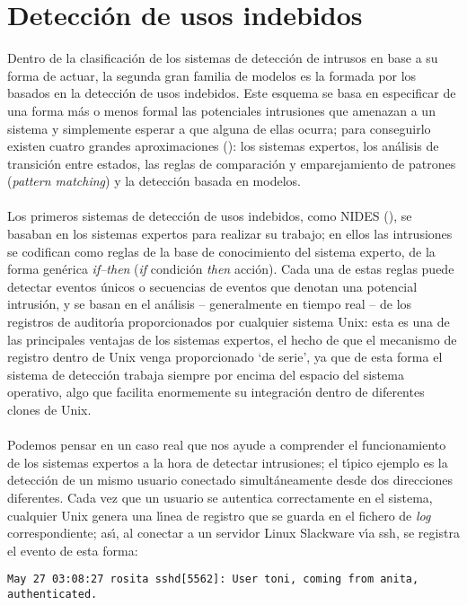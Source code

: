 \section{Detecci\'on de usos indebidos}
Dentro de la clasificaci\'on de los sistemas de detecci\'on de intrusos en
base a su forma de actuar, la segunda gran familia de modelos es la formada por
los basados en la detecci\'on de usos indebidos. Este esquema se basa en 
especificar de una forma m\'as o menos formal las potenciales intrusiones que 
amenazan a un sistema y simplemente esperar a que alguna de ellas ocurra; para
conseguirlo existen cuatro grandes aproximaciones (\cite{kn:ko96}): los 
sistemas expertos, los an\'alisis de transici\'on entre estados, las reglas de
comparaci\'on y emparejamiento de patrones ({\it pattern matching}) y la 
detecci\'on basada en modelos.\\
\\Los primeros sistemas de detecci\'on de usos indebidos, como NIDES 
(\cite{kn:lu92}), se basaban en los sistemas expertos para realizar su trabajo; 
en ellos las intrusiones se codifican como reglas de la base de conocimiento 
del sistema experto, de la forma gen\'erica {\it if--then} ({\it if} {\sc 
condici\'on} {\it then} {\sc acci\'on}). Cada una de estas reglas
puede detectar eventos \'unicos o secuencias de eventos que denotan una 
potencial intrusi\'on, y se basan en el an\'alisis -- generalmente en tiempo 
real -- de los registros de auditor\'{\i}a proporcionados por cualquier sistema
Unix: esta es una de las principales ventajas de los sistemas expertos, el hecho
de que el mecanismo de registro dentro de Unix venga proporcionado `de serie',
ya que de esta forma el sistema de detecci\'on trabaja siempre por encima del
espacio del sistema operativo, algo que facilita enormemente su integraci\'on 
dentro de diferentes clones de Unix.\\
\\Podemos pensar en un caso real que nos ayude a comprender el funcionamiento de
los sistemas expertos a la hora de detectar intrusiones; el t\'{\i}pico 
ejemplo es la detecci\'on de un mismo usuario conectado simult\'aneamente desde
dos direcciones diferentes. Cada vez que un usuario se autentica correctamente
en el sistema, cualquier Unix genera una l\'{\i}nea de registro que se guarda 
en el fichero de {\it log} correspondiente; as\'{\i}, al conectar a un servidor
Linux Slackware v\'{\i}a {\sc ssh}, se registra el evento de esta forma:
\begin{center}
\begin{verbatim}
May 27 03:08:27 rosita sshd[5562]: User toni, coming from anita, authenticated.
\end{verbatim}
\end{center}
